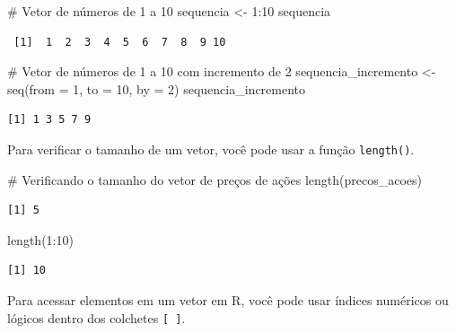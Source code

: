 \documentclass[
  portuguese,
  letterpaper,
  DIV=11,
  numbers=noendperiod]{scrreprt}
\newenvironment{Shaded}{\begin{snugshade}}{\end{snugshade}}
\newcommand{\AttributeTok}[1]{\textcolor[rgb]{0.40,0.45,0.13}{#1}}
\newcommand{\CommentTok}[1]{\textcolor[rgb]{0.37,0.37,0.37}{#1}}
\newcommand{\DecValTok}[1]{\textcolor[rgb]{0.68,0.00,0.00}{#1}}
\newcommand{\FunctionTok}[1]{\textcolor[rgb]{0.28,0.35,0.67}{#1}}
\newcommand{\NormalTok}[1]{\textcolor[rgb]{0.00,0.23,0.31}{#1}}
\newcommand{\OtherTok}[1]{\textcolor[rgb]{0.00,0.23,0.31}{#1}}
\newcommand{\SpecialCharTok}[1]{\textcolor[rgb]{0.37,0.37,0.37}{#1}}
\theoremstyle{definition}
\theoremstyle{remark}
\begin{document}
\begin{Shaded}
\begin{Highlighting}[]
\CommentTok{\# Vetor de números de 1 a 10}
\NormalTok{sequencia }\OtherTok{\textless{}{-}} \DecValTok{1}\SpecialCharTok{:}\DecValTok{10}
\NormalTok{sequencia}
\end{Highlighting}
\end{Shaded}

\begin{verbatim}
 [1]  1  2  3  4  5  6  7  8  9 10
\end{verbatim}

\begin{Shaded}
\begin{Highlighting}[]
\CommentTok{\# Vetor de números de 1 a 10 com incremento de 2}
\NormalTok{sequencia\_incremento }\OtherTok{\textless{}{-}} \FunctionTok{seq}\NormalTok{(}\AttributeTok{from =} \DecValTok{1}\NormalTok{, }\AttributeTok{to =} \DecValTok{10}\NormalTok{, }\AttributeTok{by =} \DecValTok{2}\NormalTok{)}
\NormalTok{sequencia\_incremento}
\end{Highlighting}
\end{Shaded}

\begin{verbatim}
[1] 1 3 5 7 9
\end{verbatim}

Para verificar o tamanho de um vetor, você pode usar a função
\texttt{length()}.

\begin{Shaded}
\begin{Highlighting}[]
\CommentTok{\# Verificando o tamanho do vetor de preços de ações}
\FunctionTok{length}\NormalTok{(precos\_acoes)}
\end{Highlighting}
\end{Shaded}

\begin{verbatim}
[1] 5
\end{verbatim}

\begin{Shaded}
\begin{Highlighting}[]
\FunctionTok{length}\NormalTok{(}\DecValTok{1}\SpecialCharTok{:}\DecValTok{10}\NormalTok{)}
\end{Highlighting}
\end{Shaded}

\begin{verbatim}
[1] 10
\end{verbatim}

Para acessar elementos em um vetor em R, você pode usar índices
numéricos ou lógicos dentro dos colchetes \texttt{{[}\ {]}}.
\end{document}
